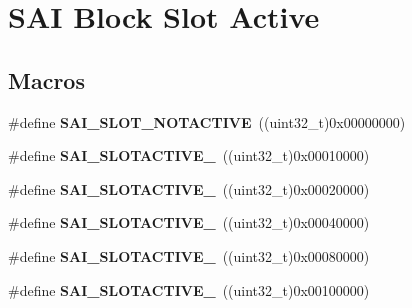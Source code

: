 \hypertarget{group___s_a_i___block___slot___active}{}\section{S\+AI Block Slot Active}
\label{group___s_a_i___block___slot___active}
\subsection*{Macros}
\begin{DoxyCompactItemize}
\item 
\#define {\bfseries S\+A\+I\+\_\+\+S\+L\+O\+T\+\_\+\+N\+O\+T\+A\+C\+T\+I\+VE}~((uint32\+\_\+t)0x00000000)\hypertarget{group___s_a_i___block___slot___active_gae472f07a29e507376dfc996eb4df0a85}{}\label{group___s_a_i___block___slot___active_gae472f07a29e507376dfc996eb4df0a85}

\item 
\#define {\bfseries S\+A\+I\+\_\+\+S\+L\+O\+T\+A\+C\+T\+I\+V\+E\+\_}~((uint32\+\_\+t)0x00010000)\hypertarget{group___s_a_i___block___slot___active_gadd2d326ddf66d8f8c9ed481884d00973}{}\label{group___s_a_i___block___slot___active_gadd2d326ddf66d8f8c9ed481884d00973}

\item 
\#define {\bfseries S\+A\+I\+\_\+\+S\+L\+O\+T\+A\+C\+T\+I\+V\+E\+\_}~((uint32\+\_\+t)0x00020000)\hypertarget{group___s_a_i___block___slot___active_ga9f01a3f32ac055eb33c26538612fb27e}{}\label{group___s_a_i___block___slot___active_ga9f01a3f32ac055eb33c26538612fb27e}

\item 
\#define {\bfseries S\+A\+I\+\_\+\+S\+L\+O\+T\+A\+C\+T\+I\+V\+E\+\_}~((uint32\+\_\+t)0x00040000)\hypertarget{group___s_a_i___block___slot___active_ga02e6839dd5ddaa29fd4c816970e5d108}{}\label{group___s_a_i___block___slot___active_ga02e6839dd5ddaa29fd4c816970e5d108}

\item 
\#define {\bfseries S\+A\+I\+\_\+\+S\+L\+O\+T\+A\+C\+T\+I\+V\+E\+\_}~((uint32\+\_\+t)0x00080000)\hypertarget{group___s_a_i___block___slot___active_gab5119ff876ef37ce181503b7fa7d98fe}{}\label{group___s_a_i___block___slot___active_gab5119ff876ef37ce181503b7fa7d98fe}

\item 
\#define {\bfseries S\+A\+I\+\_\+\+S\+L\+O\+T\+A\+C\+T\+I\+V\+E\+\_}~((uint32\+\_\+t)0x00100000)\hypertarget{group___s_a_i___block___slot___active_ga18cc8538c1fa89ebe87bc2d32455c1a6}{}\label{group___s_a_i___block___slot___active_ga18cc8538c1fa89ebe87bc2d32455c1a6}


\end{DoxyCompactItemize}
